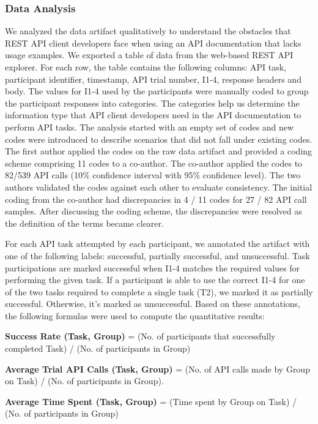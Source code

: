 \subsubsection{Data Analysis}
We analyzed the data artifact qualitatively to understand the obstacles that REST API client developers face when using an API documentation that lacks usage examples. We exported a table of data from the web-based REST API explorer. For each row, the table contains the following columns: API task, participant identifier, timestamp, API trial number, I1-4, response headers and body. The values for I1-4 used by the participants were manually coded to group the participant responses into categories. The categories help us determine the information type that API client developers need in the API documentation to perform API tasks. The analysis started with an empty set of codes and new codes were introduced to describe scenarios that did not fall under existing codes. The first author applied the codes on the raw data artifact and provided a coding scheme comprising 11 codes to a co-author. The co-author applied the codes to 82/539 API calls (10\% confidence interval with 95\% confidence level). The two authors validated the codes against each other to evaluate consistency. The initial coding from the co-author had discrepancies in 4 / 11 codes for 27 / 82 API call samples. After discussing the coding scheme, the discrepancies were resolved as the definition of the terms became clearer.

For each API task attempted by each participant, we annotated the artifact with one of the following labels: successful, partially successful, and unsuccessful. Task participations are marked successful when I1-4 matches the required values for performing the given task. If a participant is able to use the correct I1-4 for one of the two tasks required to complete a single task (T2), we marked it as partially successful. Otherwise, it's marked as unsuccessful. Based on these annotations, the following formulas were used to compute the quantitative results:



\textbf{Success Rate (Task, Group)} = (No. of participants that successfully completed Task) / (No. of participants in Group)

\textbf{Average Trial API Calls (Task, Group)} = (No. of API calls made by Group on Task) / (No. of participants in Group).

\textbf{Average Time Spent (Task, Group)} = (Time spent by Group on Task) / (No. of participants in Group)


